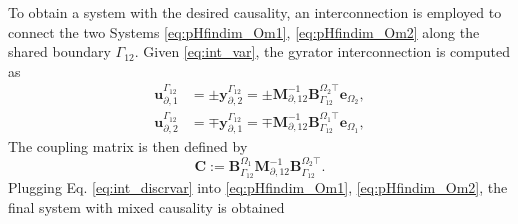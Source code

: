 To obtain a system with the desired causality, an interconnection is employed to connect the two Systems \eqref{eq:pHfindim_Om1}, \eqref{eq:pHfindim_Om2} along the shared boundary $\Gamma_{12}$. Given \eqref{eq:int_var}, the gyrator interconnection is computed as
\begin{equation}\label{eq:int_discrvar}
\begin{aligned}
{\mathbf{u}_{\partial, 1}^{\Gamma_{12}}} &= \pm {\mathbf{y}_{\partial, 2}^{\Gamma_{12}}}= \pm \mathbf{M}_{\partial, 12}^{-1} \mathbf{B}_{\Gamma_{12}}^{\Omega_2 \top} \mathbf{e}_{\Omega_2}, \\ {\mathbf{u}_{\partial, 2}^{\Gamma_{12}}} &= \mp {\mathbf{y}_{\partial, 1}^{\Gamma_{12}}}=\mp \mathbf{M}_{\partial, 12}^{-1} \mathbf{B}_{\Gamma_{12}}^{\Omega_1 \top} \mathbf{e}_{\Omega_1}, 
\end{aligned}
\end{equation}
The coupling matrix is then defined by 
\begin{equation}
\mathbf{C} := \mathbf{B}_{\Gamma_{12}}^{\Omega_1}\mathbf{M}_{\partial, 12}^{-1} \mathbf{B}_{\Gamma_{12}}^{\Omega_2 \top}.	
\end{equation}
Plugging Eq. \eqref{eq:int_discrvar} into \ref{eq:pHfindim_Om1}, \ref{eq:pHfindim_Om2}, the final system with mixed causality is obtained

